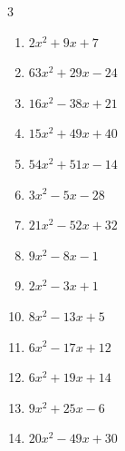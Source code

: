 \begin{multicols}{3}
\begin{enumerate}
        \phantom{$=(3x-2)(x-1)$}

  \item $2x^{2}+9x+7$

        \phantom{$=(2x+7)(x+1)$}

  \item $63x^{2}+29x-24$

        \phantom{$=(7x-3)(9x+8)$}

  \item $16x^{2}-38x+21$

        \phantom{$=(8x-7)(2x-3)$}

  \item $15x^{2}+49x+40$

        \phantom{$=(5x+8)(3x+5)$}

\columnbreak %

\resetques

  \item $54x^{2}+51x-14$

        \phantom{$=(6x+7)(9x-2)$}

  \item $3x^{2}-5x-28$

        \phantom{$=(x-4)(3x+7)$}

  \item $21x^{2}-52x+32$

        \phantom{$=(7x-8)(3x-4)$}

  \item $9x^{2}-8x-1$

        \phantom{$=(x-1)(9x+1)$}

  \item $2x^{2}-3x+1$

        \phantom{$=(2x-1)(x-1)$}

  \item $8x^{2}-13x+5$

        \phantom{$=(x-1)(8x-5)$}

  \item $6x^{2}-17x+12$

        \phantom{$=(3x-4)(2x-3)$}

  \item $6x^{2}+19x+14$

        \phantom{$=(6x+7)(x+2)$}

  \item $9x^{2}+25x-6$

        \phantom{$=(x+3)(9x-2)$}

  \item $20x^{2}-49x+30$


\end{enumerate}
\end{multicols}
